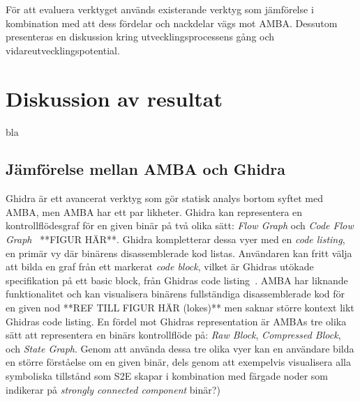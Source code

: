För att evaluera verktyget används existerande verktyg som jämförelse i
kombination med att dess fördelar och nackdelar vägs mot AMBA. Dessutom
presenteras en diskussion kring utvecklingsprocessens gång och
vidareutvecklingspotential. 

\section{Diskussion av resultat}
bla

\subsection{Jämförelse mellan AMBA och Ghidra}
Ghidra är ett avancerat verktyg som gör statisk analys bortom syftet med AMBA,
men AMBA har ett par likheter. Ghidra kan representera en
kontrollflödesgraf för en given binär på två olika sätt: \textit{Flow
Graph} och \textit{Code Flow Graph}~\cite{ghidra_website} **FIGUR
HÄR**. Ghidra kompletterar dessa vyer
med en \textit{code listing}, en primär vy där binärens
disassemblerade kod listas. Användaren kan fritt välja att bilda en
graf från ett markerat \textit{code block}, vilket är Ghidras utökade
specifikation på ett basic block, från Ghidras code
listing~\cite{ghidra_website}. 
AMBA har liknande funktionalitet och kan visualisera binärens
fullständiga
disassemblerade kod för en given nod **REF TILL FIGUR HÄR (lokes)**
men saknar större kontext likt Ghidras code
listing. En fördel mot Ghidras representation är AMBAs tre olika sätt
att
representera en binärs kontrollflöde på: \textit{Raw Block},
\textit{Compressed Block}, och \textit{State Graph}. 
Genom att använda dessa tre olika vyer kan en användare bilda en
större
förståelse om en given binär, dels genom att exempelvis visualisera
alla symboliska tillstånd som
S2E skapar i kombination med färgade noder som indikerar på
\textit{strongly connected
component}%
binär?)





